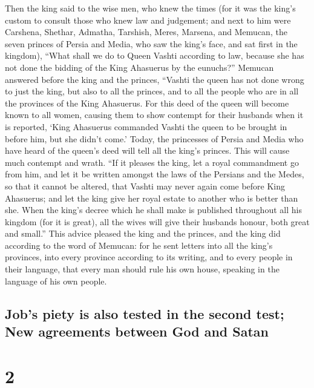  Then the king said to the wise men, who knew the times
(for it was the king's custom to consult those who knew law and
judgement;  and next to him were Carshena, Shethar,
Admatha, Tarshish, Meres, Marsena, and Memucan, the seven princes of
Persia and Media, who saw the king's face, and sat first in the
kingdom),  ``What shall we do to Queen Vashti according
to law, because she has not done the bidding of the King Ahasuerus by
the eunuchs?''  Memucan answered before the king and the
princes, ``Vashti the queen has not done wrong to just the king, but
also to all the princes, and to all the people who are in all the
provinces of the King Ahasuerus.  For this deed of the
queen will become known to all women, causing them to show contempt for
their husbands when it is reported, `King Ahasuerus commanded Vashti the
queen to be brought in before him, but she didn't come.' 
Today, the princesses of Persia and Media who have heard of the queen's
deed will tell all the king's princes. This will cause much contempt and
wrath.  ``If it pleases the king, let a royal commandment
go from him, and let it be written amongst the laws of the Persians and
the Medes, so that it cannot be altered, that Vashti may never again
come before King Ahasuerus; and let the king give her royal estate to
another who is better than she.  When the king's decree
which he shall make is published throughout all his kingdom (for it is
great), all the wives will give their husbands honour, both great and
small.''  This advice pleased the king and the princes,
and the king did according to the word of Memucan:  for
he sent letters into all the king's provinces, into every province
according to its writing, and to every people in their language, that
every man should rule his own house, speaking in the language of his own
people.

\hypertarget{jobs-piety-is-also-tested-in-the-second-test-new-agreements-between-god-and-satan}{%
\subsection{Job's piety is also tested in the second test; New
agreements between God and
Satan}\label{jobs-piety-is-also-tested-in-the-second-test-new-agreements-between-god-and-satan}}

\hypertarget{section-1}{%
\section{2}\label{section-1}}

